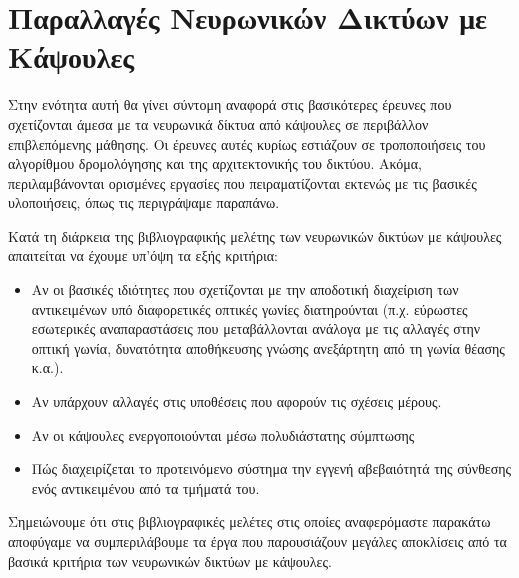 \section{Παραλλαγές Νευρωνικών Δικτύων με Κάψουλες}

Στην ενότητα αυτή θα γίνει σύντομη αναφορά στις βασικότερες έρευνες που σχετίζονται άμεσα με τα νευρωνικά δίκτυα από κάψουλες σε περιβάλλον επιβλεπόμενης μάθησης. Οι έρευνες αυτές κυρίως εστιάζουν σε τροποποιήσεις του αλγορίθμου δρομολόγησης και της αρχιτεκτονικής του δικτύου. Ακόμα, περιλαμβάνονται ορισμένες εργασίες που πειραματίζονται εκτενώς με τις βασικές υλοποιήσεις, όπως τις περιγράψαμε παραπάνω.\par

Κατά τη διάρκεια της βιβλιογραφικής μελέτης των νευρωνικών δικτύων με κάψουλες απαιτείται να έχουμε υπ'όψη τα εξής κριτήρια:
\begin{itemize}
    \item Αν οι βασικές ιδιότητες που σχετίζονται με την αποδοτική διαχείριση των αντικειμένων υπό διαφορετικές οπτικές γωνίες διατηρούνται (π.χ. εύρωστες εσωτερικές αναπαραστάσεις που μεταβάλλονται ανάλογα με τις αλλαγές στην οπτική γωνία, δυνατότητα αποθήκευσης γνώσης ανεξάρτητη από τη γωνία θέασης κ.α.).
    \item Αν υπάρχουν αλλαγές στις υποθέσεις που αφορούν τις σχέσεις μέρους.
    \item Αν οι κάψουλες ενεργοποιούνται μέσω πολυδιάστατης σύμπτωσης 
    \item Πώς διαχειρίζεται το προτεινόμενο σύστημα την εγγενή αβεβαιότητά της σύνθεσης ενός αντικειμένου από τα τμήματά του. \cite{de2020introducing}
\end{itemize}\par

Σημειώνουμε ότι στις βιβλιογραφικές μελέτες στις οποίες αναφερόμαστε παρακάτω αποφύγαμε να συμπεριλάβουμε τα έργα που παρουσιάζουν μεγάλες αποκλίσεις από τα βασικά κριτήρια των νευρωνικών δικτύων με κάψουλες.\par

\subsubsection{}

